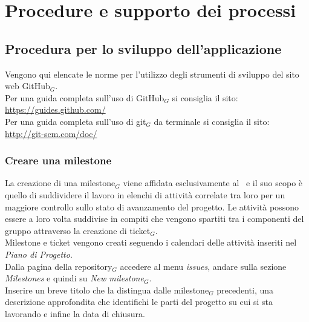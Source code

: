 \section{Procedure e supporto dei processi}
\subsection{Procedura per lo sviluppo dell'applicazione}
Vengono qui elencate le norme per l'utilizzo degli strumenti di sviluppo del sito web GitHub$_G$. \\
Per una guida completa sull'uso di GitHub$_G$ si consiglia il sito: \\
\url{https://guides.github.com/}\\
Per una guida completa sull'uso di git$_G$ da terminale si consiglia il sito: \\
\url{http://git-scm.com/doc/}

\subsubsection{Creare una milestone}
La creazione di una milestone$_G$ viene affidata esclusivamente al \ruoloResponsabile\ e il suo scopo è quello di suddividere il lavoro in elenchi di attività correlate tra loro per un maggiore controllo sullo stato di avanzamento del progetto. Le attività possono essere a loro volta suddivise in compiti che vengono spartiti tra i componenti del gruppo attraverso la creazione di ticket$_G$. \\
Milestone e ticket vengono creati seguendo i calendari delle attività inseriti nel \textit{Piano di Progetto}. \\
    Dalla pagina della repository$_G$ accedere al menu \textit{issues}, andare sulla sezione \textit{Milestones} e quindi su \textit{New milestone$_G$}.\\
    Inserire un breve titolo che la distingua dalle milestone$_G$ precedenti, una descrizione approfondita che identifichi le parti del progetto su cui si sta lavorando e infine la data di chiusura.

